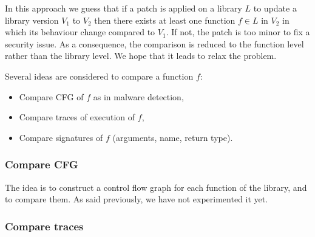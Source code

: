 \documentclass{article}
\begin{document}

 

    
    
    
   
	In this approach we guess that if a patch is applied on a library $L$ to update a library version $V_1$ to $V_2$ then there exists at least one function $f \in L$ in $V_2$ in which its behaviour change compared to $V_1$. If not, the patch is too minor to fix a security issue. As a consequence, the comparison is reduced to the function level rather than the library level. We hope that it leads to relax the problem.
	
	
  Several ideas are considered to compare a function $f$:  
	\begin{itemize}
		\item Compare CFG of $f$ as in malware detection,
		\item Compare traces of execution of $f$,
		\item Compare signatures of $f$ (arguments, name, return type).
	\end{itemize}
	
	\subsubsection{Compare CFG}
	
	The idea is to construct a control flow  graph for each function of the library, and to compare them. As said previously, we have not experimented it yet.
	
	
	\subsubsection{Compare traces}
\end{document}
